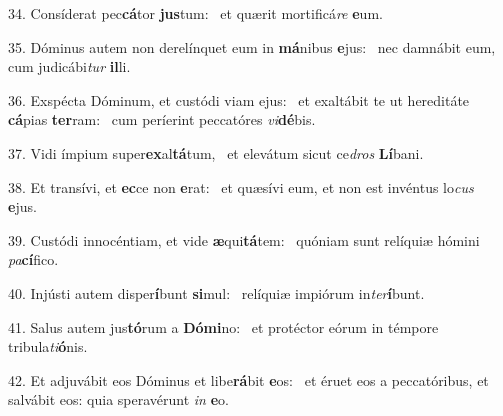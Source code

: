 34. Consíderat pec\textbf{cá}tor \textbf{jus}tum: \ast\  et quærit mortificá\textit{re} \textbf{e}um.\

35. Dóminus autem non derelínquet eum in \textbf{má}nibus \textbf{e}jus: \ast\  nec damnábit eum, cum judicábi\textit{tur} \textbf{il}li.\

36. Exspécta Dóminum, et custódi viam ejus: \dag\  et exaltábit te ut hereditáte \textbf{cá}pias \textbf{ter}ram: \ast\  cum períerint peccatóres \textit{vi}\textbf{dé}bis.\

37. Vidi ímpium super\textbf{ex}al\textbf{tá}tum, \ast\  et elevátum sicut ce\textit{dros} \textbf{Lí}bani.\

38. Et transívi, et \textbf{ec}ce non \textbf{e}rat: \ast\  et quæsívi eum, et non est invéntus lo\textit{cus} \textbf{e}jus.\

39. Custódi innocéntiam, et vide \textbf{æ}qui\textbf{tá}tem: \ast\  quóniam sunt relíquiæ hómini \textit{pa}\textbf{cí}fico.\

40. Injústi autem disper\textbf{í}bunt \textbf{si}mul: \ast\  relíquiæ impiórum in\textit{ter}\textbf{í}bunt.\

41. Salus autem jus\textbf{tó}rum a \textbf{Dó}\textbf{mi}no: \ast\  et protéctor eórum in témpore tribula\textit{ti}\textbf{ó}nis.\

42. Et adjuvábit eos Dóminus et libe\textbf{rá}bit \textbf{e}os: \ast\  et éruet eos a peccatóribus, et salvábit eos: quia speravérunt \textit{in} \textbf{e}o.\

